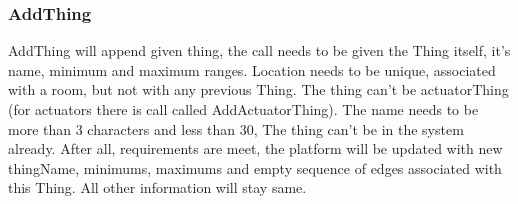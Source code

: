 \documentclass{article}
\newcommand{\same}[1]{\\{#1}'={#1}}
\newcommand{\sameObvious}[1]{\same{rooms}\same{allThings}\same{noiseThings}\same{tempThings}\same{lightThings}\same{actuatorThings}  }
\begin{document}
\newpage
\label{toc:AddThing}
\subsubsection{AddThing}
AddThing will append given thing, the call needs to be given the Thing itself, it's name, minimum and maximum ranges. Location needs to be unique, associated with a room, but not with any previous Thing. The thing can't be actuatorThing (for actuators there is call called  AddActuatorThing). The name needs to be more than 3 characters and less than 30, The thing can't be in the system already. After all, requirements are meet, the platform will be updated with new thingName, minimums, maximums and empty sequence  of edges associated with this Thing. All other information will stay same.

\newpage
\label{toc:AddActuatorThing}
\end{document}
